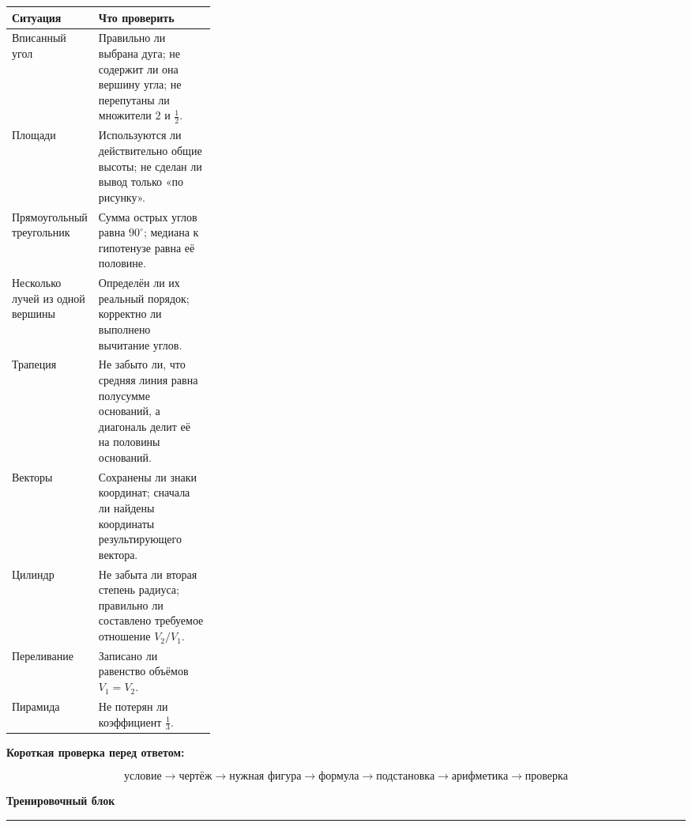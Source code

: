 \documentclass[a4paper,12pt]{article}
\newcommand{\topic}[1]{%
  \vspace{0.8em}
  {\Large\bfseries\textcolor{darkaccent}{#1}}\par
  \vspace{0.25em}
  {\color{accent}\rule{\linewidth}{0.6pt}}
  \vspace{0.45em}
}
\newcommand{\key}[1]{\textcolor{darkaccent}{\textbf{#1}}}
\begin{document}
\begin{tabularx}{\linewidth}{@{}p{0.30\linewidth}X@{}}
\toprule
\textbf{Ситуация} & \textbf{Что проверить} \\
\midrule

Вписанный угол
&
Правильно ли выбрана дуга; не содержит ли она вершину угла; не перепутаны ли множители \(2\) и \(\frac12\).
\\[2mm]

Площади
&
Используются ли действительно общие высоты; не сделан ли вывод только «по рисунку».
\\[2mm]

Прямоугольный треугольник
&
Сумма острых углов равна \(90^\circ\); медиана к гипотенузе равна её половине.
\\[2mm]

Несколько лучей из одной вершины
&
Определён ли их реальный порядок; корректно ли выполнено вычитание углов.
\\[2mm]

Трапеция
&
Не забыто ли, что средняя линия равна полусумме оснований, а диагональ делит её на половины оснований.
\\[2mm]

Векторы
&
Сохранены ли знаки координат; сначала ли найдены координаты результирующего вектора.
\\[2mm]

Цилиндр
&
Не забыта ли вторая степень радиуса; правильно ли составлено требуемое отношение \(V_2/V_1\).
\\[2mm]

Переливание
&
Записано ли равенство объёмов \(V_1=V_2\).
\\[2mm]

Пирамида
&
Не потерян ли коэффициент \(\frac13\).
\\

\bottomrule
\end{tabularx}

\vspace{6mm}

\key{Короткая проверка перед ответом:}

\[
\boxed{
\text{условие}
\to
\text{чертёж}
\to
\text{нужная фигура}
\to
\text{формула}
\to
\text{подстановка}
\to
\text{арифметика}
\to
\text{проверка}
}
\]


\clearpage

\topic{Тренировочный блок}
\end{document}
